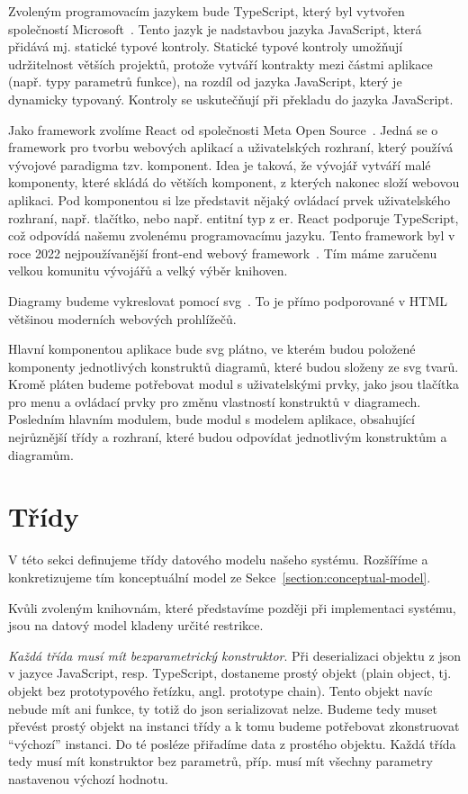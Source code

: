 Zvoleným programovacím jazykem bude TypeScript, který byl vytvořen společností Microsoft~\cite{microsoft_typescriptjavascript_2023}.
Tento jazyk je nadstavbou jazyka JavaScript, která přidává mj. statické typové kontroly.
Statické typové kontroly umožňují udržitelnost větších projektů, protože vytváří kontrakty mezi částmi aplikace (např. typy parametrů funkce), na rozdíl od jazyka JavaScript, který je dynamicky typovaný.
Kontroly se uskutečňují při překladu do jazyka JavaScript.

Jako framework zvolíme React od společnosti Meta Open Source~\cite{react_2023}.
Jedná se o framework pro tvorbu webových aplikací a uživatelských rozhraní, který používá vývojové paradigma tzv. komponent.
Idea je taková, že vývojář vytváří malé komponenty, které skládá do větších komponent, z kterých nakonec složí webovou aplikaci.
Pod komponentou si lze představit nějaký ovládací prvek uživatelského rozhraní, např. tlačítko, nebo např. entitní typ z \acrshort{er}.
React podporuje TypeScript, což odpovídá našemu zvolenému programovacímu jazyku.
Tento framework byl v roce 2022 nejpoužívanější front-end webový framework~\cite{stackoverflow_developersurvey_2022}.
Tím máme zaručenu velkou komunitu vývojářů a velký výběr knihoven.

Diagramy budeme vykreslovat pomocí \acrfull{svg}~\cite{brinza_svg_2018}.
To je přímo podporované v HTML většinou moderních webových prohlížečů.

Hlavní komponentou aplikace bude \acrshort{svg} plátno, ve kterém budou položené komponenty jednotlivých konstruktů diagramů, které budou složeny ze \acrshort{svg} tvarů.
Kromě pláten budeme potřebovat modul s uživatelskými prvky, jako jsou tlačítka pro menu a ovládací prvky pro změnu vlastností konstruktů v diagramech.
Posledním hlavním modulem, bude modul s modelem aplikace, obsahující nejrůznější třídy a rozhraní, které budou odpovídat jednotlivým konstruktům a diagramům.

\section{Třídy}

V této sekci definujeme třídy datového modelu našeho systému.
Rozšíříme a konkretizujeme tím konceptuální model ze Sekce~\ref{section:conceptual-model}.

Kvůli zvoleným knihovnám, které představíme později při implementaci systému, jsou na datový model kladeny určité restrikce.

\emph{Každá třída musí mít bezparametrický konstruktor}.
Při deserializaci objektu z \acrshort{json} v jazyce JavaScript, resp. TypeScript, dostaneme prostý objekt (plain object, tj. objekt bez prototypového řetízku, angl. prototype chain).
Tento objekt navíc nebude mít ani funkce, ty totiž do \acrshort{json} serializovat nelze.
Budeme tedy muset převést prostý objekt na instanci třídy a k tomu budeme potřebovat zkonstruovat \enquote{výchozí} instanci.
Do té posléze přiřadíme data z prostého objektu.
Každá třída tedy musí mít konstruktor bez parametrů, příp. musí mít všechny parametry nastavenou výchozí hodnotu.

